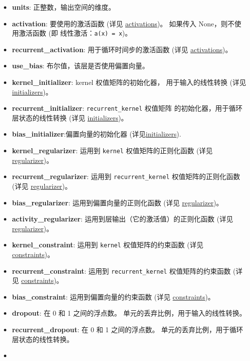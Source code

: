 \begin{itemize}
\tightlist
\item
  \textbf{units}: 正整数，输出空间的维度。
\item
  \textbf{activation}: 要使用的激活函数 (详见
  \hyperref[activations]{activations})。 如果传入
  None，则不使用激活函数 (即 线性激活：\texttt{a(x)\ =\ x})。
\item
  \textbf{recurrent\_activation}: 用于循环时间步的激活函数 (详见
  \hyperref[activations]{activations})。
\item
  \textbf{use\_bias}: 布尔值，该层是否使用偏置向量。
\item
  \textbf{kernel\_initializer}: kernel 权值矩阵的初始化器，
  用于输入的线性转换 (详见 \hyperref[initializers]{initializers})。
\item
  \textbf{recurrent\_initializer}: \texttt{recurrent\_kernel} 权值矩阵
  的初始化器，用于循环层状态的线性转换 (详见
  \hyperref[initializers]{initializers})。
\item
  \textbf{bias\_initializer}:偏置向量的初始化器
  (详见\hyperref[initializers]{initializers}).
\item
  \textbf{kernel\_regularizer}: 运用到 \texttt{kernel}
  权值矩阵的正则化函数 (详见 \hyperref[regularizers]{regularizer})。
\item
  \textbf{recurrent\_regularizer}: 运用到 \texttt{recurrent\_kernel}
  权值矩阵的正则化函数 (详见 \hyperref[regularizers]{regularizer})。
\item
  \textbf{bias\_regularizer}: 运用到偏置向量的正则化函数 (详见
  \hyperref[regularizers]{regularizer})。
\item
  \textbf{activity\_regularizer}: 运用到层输出（它的激活值）的正则化函数
  (详见 \hyperref[regularizers]{regularizer})。
\item
  \textbf{kernel\_constraint}: 运用到 \texttt{kernel} 权值矩阵的约束函数
  (详见 \hyperref[constraints]{constraints})。
\item
  \textbf{recurrent\_constraint}: 运用到 \texttt{recurrent\_kernel}
  权值矩阵的约束函数 (详见 \hyperref[constraints]{constraints})。
\item
  \textbf{bias\_constraint}: 运用到偏置向量的约束函数 (详见
  \hyperref[constraints]{constraints})。
\item
  \textbf{dropout}: 在 0 和 1 之间的浮点数。
  单元的丢弃比例，用于输入的线性转换。
\item
  \textbf{recurrent\_dropout}: 在 0 和 1 之间的浮点数。
  单元的丢弃比例，用于循环层状态的线性转换。
\item

\end{itemize}
